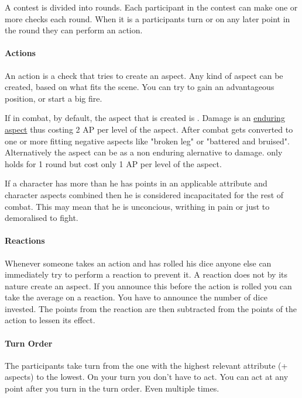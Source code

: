 \documentclass[11pt]{article}
\begin{document}
{A contest is divided into rounds. Each participant in the contest can make one or more checks each round. When it is a participants turn or on any later point in the round they can perform an action.

\paragraph*{Actions}
\label{sec:org2eca298}
An action is a check that tries to create an aspect. Any kind of aspect can be created, based on what fits the scene. You can try to gain an advantageous position, or start a big fire.

If in combat, by default, the aspect that is created is . Damage is an \hyperref[sec:orgbfa3fe3]{enduring aspect} thus costing 2 AP per level of the aspect. After combat  gets converted to one or more fitting negative aspects like "broken leg" or "battered and bruised". 
Alternatively the aspect can be  as a non enduring alernative to damage.  only holds for 1 round but cost only 1 AP per level of the aspect.

If a character has more  than he has points in an applicable attribute and character aspects combined then he is considered incapacitated for the rest of combat. This may mean that he is unconcious, writhing in pain or just to demoralised to fight.

\paragraph*{Reactions}
\label{sec:org905edf4}
Whenever someone takes an action and has rolled his dice anyone else can immediately try to perform a reaction to prevent it. A reaction does not by its nature create an aspect. If you announce this before the action is rolled you can take the average on a reaction. You have to announce the number of dice invested. The points from the reaction are then subtracted from the points of the action to lessen its effect.

\paragraph*{Turn Order}
\label{sec:org71bb771}
The participants take turn from the one with the highest relevant attribute (+ aspects) to the lowest. On your turn you don't have to act. You can act at any point after you turn in the turn order. Even multiple times. 

}
\end{document}
